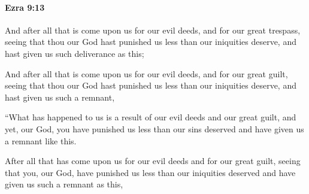		\paragraph{Ezra 9:13} %
			\label{EZRA-9-13}

			And after all that is come upon us for our evil deeds, and for our great trespass, seeing that thou our God hast punished us less than our iniquities deserve, and hast given us such deliverance as this;

			\begin{versebox}
					\item[BHS] 
					\item[LXX] 
					\item[ASV] And after all that is come upon us for our evil deeds, and for our great guilt, seeing that thou our God hast punished us less than our iniquities deserve, and hast given us such a remnant,
					\item[NIV] “What has happened to us is a result of our evil deeds and our great guilt, and yet, our God, you have punished us less than our sins deserved and have given us a remnant like this.
					\item[NRSV] After all that has come upon us for our evil deeds and for our great guilt, seeing that you, our God, have punished us less than our iniquities deserved and have given us such a remnant as this,
			\end{versebox}

